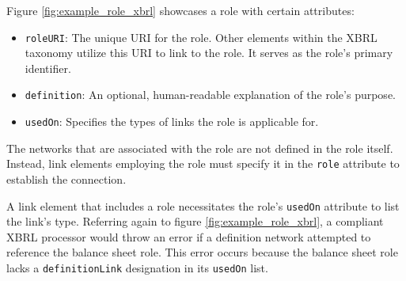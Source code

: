 

Figure \ref{fig:example_role_xbrl} showcases a role with certain attributes:

\begin{itemize}
    \item \texttt{roleURI}: The unique URI for the role. Other elements within the XBRL taxonomy utilize this URI to link to the role. It serves as the role's primary identifier.
    \item \texttt{definition}: An optional, human-readable explanation of the role's purpose.
    \item \texttt{usedOn}: Specifies the types of links the role is applicable for.
\end{itemize}

The networks that are associated with the role are not defined in the role itself.
Instead, link elements employing the role must specify it in the \texttt{role} attribute to establish the connection.

A link element that includes a role necessitates the role's \texttt{usedOn} attribute to list the link's type.
Referring again to figure \ref{fig:example_role_xbrl}, 
a compliant XBRL processor would throw an error if a definition network attempted to reference the balance sheet role.
This error occurs because the balance sheet role lacks a \texttt{definitionLink} designation in its \texttt{usedOn} list.

